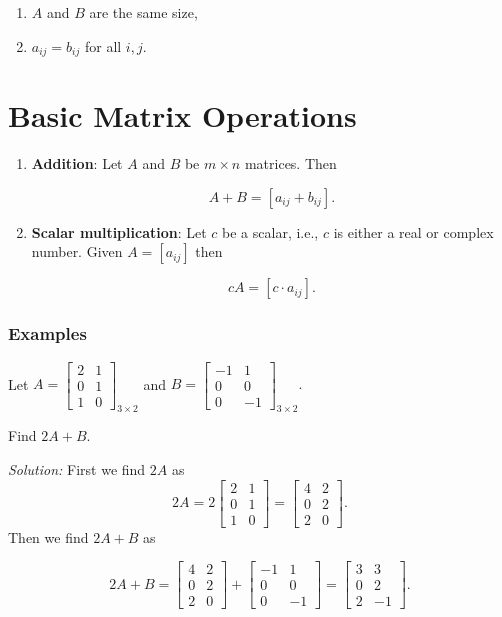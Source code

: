 \documentclass[12pt]{article}
\theoremstyle{definition}
\begin{document}
\begin{enumerate}
\item $A$ and $B$ are the same size,
\item $a_{ij} = b_{ij}$ for all $i,j$.
\end{enumerate}

\section{Basic Matrix Operations}

\begin{enumerate}
\item \textbf{Addition}: Let $A$ and $B$ be $m \times n$ matrices. Then

\[
A + B = [a_{ij} + b_{ij}].
\]

\item \textbf{Scalar multiplication}: Let $c$ be a scalar, i.e., $c$ is either a real or complex
number. Given $A = [a_{ij}]$ then

\[
cA = [c \cdot a_{ij}].
\]
\end{enumerate}

\subsubsection{Examples}

Let 
$
A =
\begin{bmatrix}
2 & 1 \\
0 & 1 \\
1 & 0
\end{bmatrix}_{3 \times 2}
$ and
$
B =
\begin{bmatrix}
-1 & 1 \\
0 & 0 \\
0 & -1
\end{bmatrix}_{3 \times 2}.
$

Find $2A + B$.

\textit{Solution:} First we find $2A$ as
\[
2A =
2
\begin{bmatrix}
2 & 1 \\
0 & 1 \\
1 & 0
\end{bmatrix}
=
\begin{bmatrix}
4 & 2 \\
0 & 2 \\
2 & 0
\end{bmatrix}.
\]
Then we find $2A + B$ as

\[
2A + B =
\begin{bmatrix}
4 & 2 \\
0 & 2 \\
2 & 0
\end{bmatrix}
+
\begin{bmatrix}
-1 & 1 \\
0 & 0 \\
0 & -1
\end{bmatrix}
=
\begin{bmatrix}
3 & 3 \\
0 & 2 \\
2 & -1
\end{bmatrix}.
\]
\end{document}
